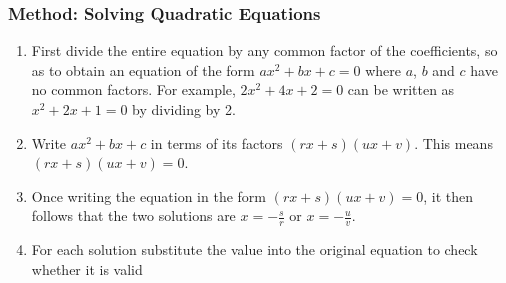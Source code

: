             \subsubsection{ Method: Solving Quadratic Equations}
            \nopagebreak
        \label{m39247*id150020}\begin{enumerate}[noitemsep, label=\textbf{\arabic*}. ] 
            \label{m39247*uid37}\item First divide the entire equation by any common factor of the coefficients,
so as to obtain an equation of the form $a{x}^{2}+bx+c=0$ where $a$, $b$ and
$c$ have no common factors. For example, $2{x}^{2}+4x+2=0$\hspace{1ex} can be written as
${x}^{2}+2x+1=0$\hspace{1ex} by dividing by 2.
\label{m39247*uid38}\item Write $a{x}^{2}+bx+c$ in terms of its factors $\left(rx+s\right)\left(ux+v\right)$.
This means $\left(rx+s\right)\left(ux+v\right)=0$.
\label{m39247*uid39}\item Once writing the equation in the form $\left(rx+s\right)\left(ux+v\right)=0$, it then
follows that the two solutions are $x=-\frac{s}{r}$ or $x=-\frac{u}{v}$.
\item For each solution substitute the value into the original equation to check whether it is valid\end{enumerate}
\label{m39247*secfhsst!!!underscore!!!id2128}
